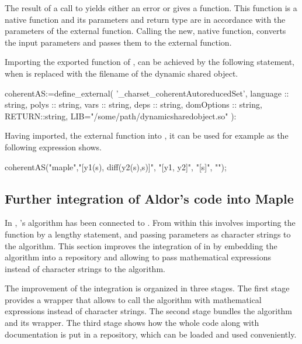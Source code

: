 The result of a call to  yields either an error or gives a function. This function is a native \Maple function and its parameters and return type are in accordance with the parameters of the external function. Calling the new, native \Maple function, converts the input parameters and passes them to the external function.

Importing the exported function of , can be achieved by the following \Maple statement, when  is replaced with the filename of the dynamic shared object.
\clearpage
\begin{mapleprogram}
coherentAS:=define_external(
         '_charset_coherentAutoreducedSet', 
         language   :: string, 
         polys      :: string,
         vars       :: string,
         deps       :: string,
         domOptions :: string,
         RETURN::string,
         LIB="/some/path/dynamicsharedobject.so"
):
\end{mapleprogram}

Having imported, the external function into \Maple, it can be used for example as the following expression shows.

\begin{mapleprogram}
coherentAS("maple","[y1(s), diff(y2(s),s)]", "[y1, y2]", "[s]", "");
\end{mapleprogram}

\subsection{Further integration of Aldor's code into Maple}

In , \Aldor's \exportedsymbol algorithm has been connected to \Maple. From within \Maple this involves importing the function by a lengthy statement, and passing parameters as character strings to the algorithm. This section improves the integration of \exportedsymbol in \Maple by embedding the algorithm into a \Maple repository and allowing to pass mathematical expressions instead of character strings to the algorithm.

The improvement of the integration is organized in three stages. The first stage provides a wrapper that allows to call the algorithm with mathematical expressions instead of character strings. The second stage bundles the algorithm and its wrapper. The third stage shows how the whole code along with documentation is put in a \Maple repository, which can be loaded and used conveniently.

